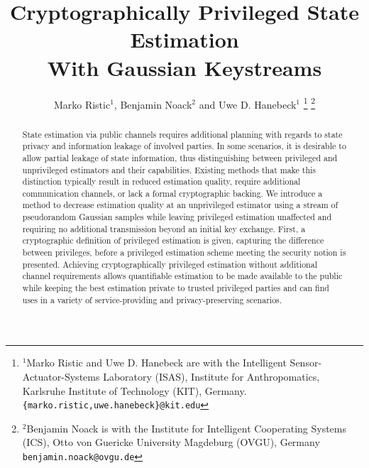 \documentclass[letterpaper, 10 pt, conference]{ieeeconf}
\title{\LARGE \bf
Cryptographically Privileged State Estimation\\With Gaussian Keystreams
}
\author{Marko Ristic$^{1}$, Benjamin Noack$^{2}$ and Uwe D. Hanebeck$^{1}$%
\thanks{$^{1}$Marko Ristic and Uwe D. Hanebeck are with the Intelligent Sensor-Actuator-Systems Laboratory (ISAS), Institute for Anthropomatics, Karlsruhe Institute of Technology (KIT), Germany.\newline
{\tt\small \{marko.ristic,uwe.hanebeck\}@kit.edu}%
}%
\thanks{$^{2}$Benjamin Noack is with the Institute for Intelligent Cooperating Systems (ICS),
Otto von Guericke University Magdeburg (OVGU), Germany\newline
{\tt\small benjamin.noack@ovgu.de}%
}%
}
\begin{document}
\maketitle
\thispagestyle{empty}
\pagestyle{empty}


% 
%                                                                                             
%                                                                                             
%                                                                                             
% 

\begin{abstract}
State estimation via public channels requires additional planning with regards to state privacy and information leakage of involved parties. In some scenarios, it is desirable to allow partial leakage of state information, thus distinguishing between privileged and unprivileged estimators and their capabilities. Existing methods that make this distinction typically result in reduced estimation quality, require additional communication channels, or lack a formal cryptographic backing. We introduce a method to decrease estimation quality at an unprivileged estimator using a stream of pseudorandom Gaussian samples while leaving privileged estimation unaffected and requiring no additional transmission beyond an initial key exchange. First, a cryptographic definition of privileged estimation is given, capturing the difference between privileges, before a privileged estimation scheme meeting the security notion is presented. Achieving cryptographically privileged estimation without additional channel requirements allows quantifiable estimation to be made available to the public while keeping the best estimation private to trusted privileged parties and can find uses in a variety of service-providing and privacy-preserving scenarios.
\end{abstract}
\end{document}
